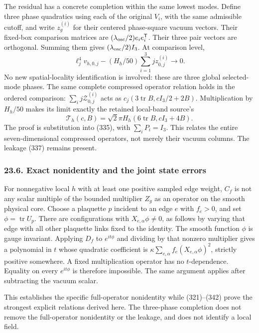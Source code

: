 \documentclass[
  11pt,
]{article}
\begin{document}
The residual has a concrete completion within the same lowest modes.
Define three phase quadratics using each of the original \(V_i\), with
the same admissible cutoff, and write \(z_g^{(i)}\) for their centered
phase-square vacuum vectors. Their fixed-box comparison matrices are
\((\lambda_{\rm osc}/2)e_i e_i^{\mathsf T}\). Their three pair vectors
are orthogonal. Summing them gives \((\lambda_{\rm osc}/2)I_3\). At
comparison level, \[
 \ell_j^4v_{h,0,j}-(H_h/50)\sum_{i=1}^3jz_{0,j}^{(i)}
                         \longrightarrow0.
 \tag{342}
\] No new spatial-locality identification is involved: these are three
global selected-mode phases. The same complete compressed operator
relation holds in the ordered comparison:
\(\sum_i j\mathcal Z_{0,j}^{(i)}\) acts as
\(c_j(3\operatorname{tr}B,cI_3/2+2B)\). Multiplication by \(H_h/50\)
makes its limit exactly the retained local-band source's \[
 \mathcal T_h(c,B)=\sqrt2\pi H_h
                 (6\operatorname{tr}B,cI_3+4B).
\] The proof is substitution into (335), with \(\sum_iP_i=I_3\). This
relates the entire seven-dimensional compressed operators, not merely
their vacuum columns. The leakage (337) remains present.

\subsubsection{23.6. Exact nonidentity and the joint state
errors}\label{exact-nonidentity-and-the-joint-state-errors}

For nonnegative local \(h\) with at least one positive sampled edge
weight, \(C_f\) is not any scalar multiple of the bounded multiplier
\(Z_g\) as an operator on the smooth physical core. Choose a plaquette
\(p\) incident to an edge \(e\) with \(f_e>0\), and set
\(\phi=\operatorname{tr}U_p\). There are configurations with
\(X_{e,\alpha}\phi\ne0\), as follows by varying that edge with all other
plaquette links fixed to the identity. The smooth function \(\phi\) is
gauge invariant. Applying \(D_f\) to \(e^{it\phi}\) and dividing by that
nonzero multiplier gives a polynomial in \(t\) whose quadratic
coefficient is \(\kappa\sum_{e,\alpha}f_e(X_{e,\alpha}\phi)^2\),
strictly positive somewhere. A fixed multiplication operator has no
\(t\)-dependence. Equality on every \(e^{it\phi}\) is therefore
impossible. The same argument applies after subtracting the vacuum
scalar.

This establishes the specific full-operator nonidentity while
(321)--(342) prove the strongest explicit relations derived here. The
three-phase completion does not remove the full-operator nonidentity or
the leakage, and does not identify a local field.
\end{document}
